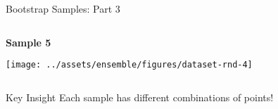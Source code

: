 \documentclass[10pt]{beamer}
\newcommand{\fitpic}[1]{\begin{adjustbox}{max width=\linewidth, max totalheight=0.78\textheight}#1\end{adjustbox}}
\begin{document}
\begin{frame}{Bootstrap Samples: Part 3}
\begin{center}
\begin{columns}
\begin{column}{0.45\textwidth}
\centering
\textbf{Sample 5}

\fitpic{\texttt{[image: ../assets/ensemble/figures/dataset-rnd-4]}}
\end{column}

\begin{column}{0.45\textwidth}
\centering
\end{column}
\end{columns}
\end{center}

\begin{keypointsbox}{Key Insight}
Each sample has different combinations of points!
\end{keypointsbox}
\end{frame}
\end{document}
